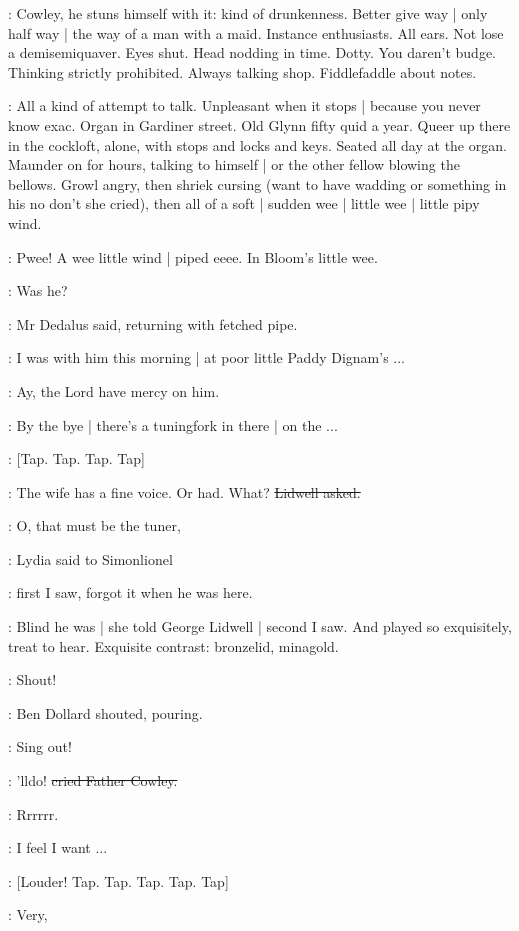 \BloomInt:
Cowley,
he stuns himself with it:
kind of drunkenness.
Better give way |
only half way |
the way of a man with a maid.
Instance enthusiasts.
All ears.
Not lose a demisemiquaver.
Eyes shut.
Head nodding in time.
Dotty.
You daren't budge.
Thinking strictly prohibited.
Always talking shop.
Fiddlefaddle about notes.

\BloomInt:
All a kind of attempt to talk.
Unpleasant when it stops |
because you never know exac.
Organ in Gardiner street.
Old Glynn fifty quid a year.
Queer up there in the cockloft,
alone,
with stops and locks and keys.
Seated all day at the organ.
Maunder on for hours,
talking to himself |
or the other fellow blowing the bellows.
Growl angry,
then shriek cursing
(want to have wadding or something in his no don't she cried),
then all of a soft |
sudden wee |
little wee |
little pipy wind.

:
Pwee!
A wee little wind |
piped eeee.
In Bloom's little wee.

\simon:
Was he?

:
Mr Dedalus said,
returning with fetched pipe.

\simon:
I was with him this morning |
at poor little Paddy Dignam's ...

\cowley:
Ay,
the Lord have mercy on him.

\simon:
By the bye |
there's a tuningfork in there |
on the ...

\stripling:
[Tap.
Tap.
Tap.
Tap]

\lidwell:
The wife has a fine voice.
Or had.
What?
\sout{Lidwell asked.}

\MissD:
O,
that must be the tuner,

:
Lydia said to Simonlionel

\MissD:
first I saw,
forgot it when he was here.

:
Blind he was |
she told George Lidwell |
second I saw.
And played so exquisitely,
treat to hear.
Exquisite contrast:
bronzelid,
minagold.

\dollard:
Shout!

:
Ben Dollard shouted,
pouring.

\dollard:
Sing out!

\cowley:
'lldo!
\sout{cried Father Cowley.}

:
Rrrrrr.

\BloomInt:
I feel I want ...

\stripling:
[Louder!
Tap.
Tap.
Tap.
Tap.
Tap]

\simon:
Very,


